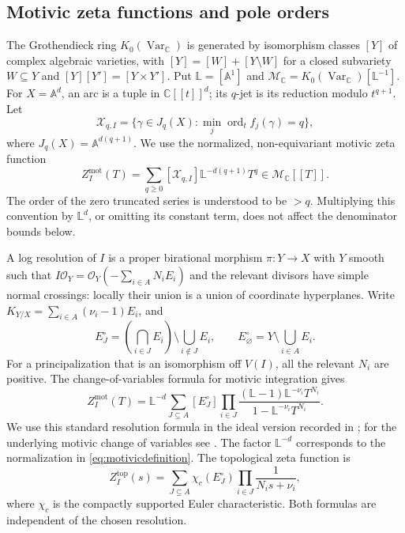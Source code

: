 \documentclass[11pt,a4paper]{article}
\numberwithin{equation}{section}
\theoremstyle{definition}
\newcommand{\C}{\mathbb C}
\begin{document}
\subsection{Motivic zeta functions and pole orders}\label{subsec:motivic}
The Grothendieck ring $K_0(\operatorname{Var}_{\C})$ is generated by
isomorphism classes $[Y]$ of complex algebraic varieties, with
$[Y]=[W]+[Y\setminus W]$ for a closed subvariety $W\subseteq Y$
and $[Y][Y']=[Y\times Y']$. Put
$\mathbb L=[\mathbb A^1]$ and
$\mathcal M_{\C}=K_0(\operatorname{Var}_{\C})[\mathbb L^{-1}]$.
For $X=\mathbb A^d$, an arc is a tuple in $\C[[t]]^d$; its
$q$-jet is its reduction modulo $t^{q+1}$. Let
\[
\mathcal X_{q,I}=\{\gamma\in J_q(X):
           \min_j\operatorname{ord}_t f_j(\gamma)=q\},
\]
where $J_q(X)=\mathbb A^{d(q+1)}$. We use the normalized,
non-equivariant motivic zeta function
\begin{equation}\label{eq:motivicdefinition}
Z_I^{\mathrm{mot}}(T)
=\sum_{q\ge0}[\mathcal X_{q,I}]\mathbb L^{-d(q+1)}T^q
\in\mathcal M_{\C}[[T]].
\end{equation}
The order of the zero truncated series is understood to be $>q$.
Multiplying this convention by $\mathbb L^d$, or omitting its
constant term, does not affect the denominator bounds below.

A log resolution of $I$ is a proper birational morphism
$\pi:Y\to X$ with $Y$ smooth such that
$I\mathcal O_Y=\mathcal O_Y(-\sum_{i\in A}N_iE_i)$ and the relevant
divisors have simple normal crossings: locally their union is a
union of coordinate hyperplanes. Write
$K_{Y/X}=\sum_{i\in A}(\nu_i-1)E_i$, and
\[
E_J^\circ=\left(\bigcap_{i\in J}E_i\right)
                \setminus\bigcup_{i\notin J}E_i,
\qquad E_\varnothing^\circ=Y\setminus\bigcup_{i\in A}E_i.
\]
For a principalization that is an isomorphism off $V(I)$, all the
relevant $N_i$ are positive. The change-of-variables formula for
motivic integration gives
\begin{equation}\label{eq:motivicresolution}
Z_I^{\mathrm{mot}}(T)=\mathbb L^{-d}
 \sum_{J\subseteq A}[E_J^\circ]
 \prod_{i\in J}
 \frac{(\mathbb L-1)\mathbb L^{-\nu_i}T^{N_i}}
      {1-\mathbb L^{-\nu_i}T^{N_i}}.
\end{equation}
We use this standard resolution formula in the ideal version
recorded in \cite[Theorem~2.7]{CZ25}; for the underlying motivic
change of variables see \cite[Lemma~3.3]{DL}. The factor $\mathbb L^{-d}$
corresponds to the normalization in \eqref{eq:motivicdefinition}.
The topological zeta function is
\begin{equation}\label{eq:topologicaldefinition}
Z_I^{\mathrm{top}}(s)=
\sum_{J\subseteq A}\chi_c(E_J^\circ)
                    \prod_{i\in J}\frac1{N_i s+\nu_i},
\end{equation}
where $\chi_c$ is the compactly supported Euler characteristic.
Both formulas are independent of the chosen resolution.
\end{document}
